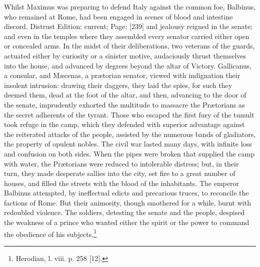 Whilst Maximus was preparing to defend Italy against the common foe, Balbinus, who remained at Rome, had been engaged in scenes of blood and intestine discord. Distrust Edition: current; Page: [239] and jealousy reigned in the senate; and even in the temples where they assembled every senator carried either open or concealed arms. In the midst of their deliberations, two veterans of the guards, actuated either by curiosity or a sinister motive, audaciously thrust themselves into the house, and advanced by degrees beyond the altar of Victory. Gallicanus, a consular, and Mæcenas, a prætorian senator, viewed with indignation their insolent intrusion: drawing their daggers, they laid the spies, for such they deemed them, dead at the foot of the altar, and then, advancing to the door of the senate, imprudently exhorted the multitude to massacre the Prætorians as the secret adherents of the tyrant. Those who escaped the first fury of the tumult took refuge in the camp, which they defended with superior advantage against the reiterated attacks of the people, assisted by the numerous bands of gladiators, the property of opulent nobles. The civil war lasted many days, with infinite loss and confusion on both sides. When the pipes were broken that supplied the camp with water, the Prætorians were reduced to intolerable distress; but, in their turn, they made desperate sallies into the city, set fire to a great number of houses, and filled the streets with the blood of the inhabitants. The emperor Balbinus attempted, by ineffectual edicts and precarious truces, to reconcile the factions of Rome. But their animosity, though smothered for a while, burnt with redoubled violence. The soldiers, detesting the senate and the people, despised the weakness of a prince who wanted either the spirit or the power to command the obedience of his subjects.\footnote{Herodian, l. viii. p. 258 [12].}

